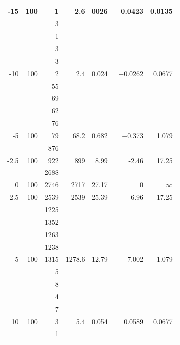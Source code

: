 \documentclass[a4paper]{article}
\begin{document}
\begin{figure}[H]
\begin{center}
\begin{adjustwidth}{-3.75cm}{}
\begin{tabular}{|r|r|r|r|r|r|r|}
        -15 & 100 & 1 & 2.6 & \num{0026} & \num{-0.0423} & \num{0.0135} \\
        \hline
                             & & 3 & & & & \\
                             & & 1 & & & & \\
                             & & 3 & & & & \\
                             & & 3 & & & & \\
        -10 & 100 & 2 & \num{2.4} & \num{0.024} & \num{-0.0262} & \num{0.0677} \\
        \hline
                             & & 55 & & & & \\
                             & & 69 & & & & \\
                             & & 62 & & & & \\
                             & & 76 & & & & \\
        -5 & 100 & 79 & 68.2 & \num{0.682} & \num{-0.373} & \num{1.079} \\
        \hline
                             & & 876 & & & & \\
        -2.5 & 100 & 922 & 899 & 8.99 & -2.46 & 17.25 \\
        \hline
                             & & 2688 & & & & \\
        0 & 100 & 2746 & 2717 & 27.17 & 0 & \( \infty \) \\
      \hline
        2.5 & 100 & 2539 & 2539 & 25.39 & 6.96 & 17.25 \\
        \hline
                             & & 1225 & & & & \\
                             & & 1352 & & & & \\
                             & & 1263 & & & & \\
                             & & 1238 & & & & \\
        5 & 100 & 1315 & 1278.6 & 12.79 & 7.002 & 1.079 \\
        \hline
                             & & 5 & & & & \\
                             & & 8 & & & & \\
                             & & 4 & & & & \\
                             & & 7 & & & & \\
        10 & 100 & 3 & 5.4 & \num{0.054} & \num{0.0589} & \num{0.0677} \\
        \hline
                             & & 1 & & & & \\

\end{tabular}
\end{adjustwidth}
\end{center}
\end{figure}
\end{document}

